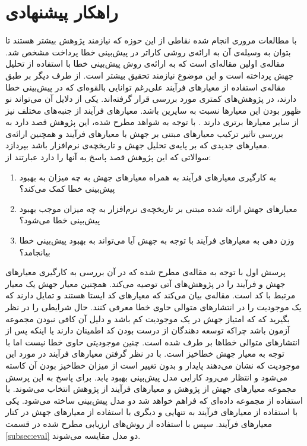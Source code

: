 \section{راهکار پیشنهادی}
\label{sec:method}
با  مطالعات مروری انجام شده نقاطی از این حوزه که نیازمند پژوهش بیشتر هستند تا بتوان به وسیله‌ی آن به ارائه‌ی روشی کاراتر در پیش‌بینی خطا پرداخت مشخص شد. مقاله‌ی \cite{bowes2016mutation} اولین مقاله‌ای است که  به ارائه‌ی روش پیش‌بینی خطا با استفاده از تحلیل جهش پرداخته است و این موضوع نیازمند تحقیق بیشتر است. از طرف دیگر بر طبق مقاله‌ی \cite{radjenovic2013software} استفاده از معیارهای فرآیند علی‌رغم توانایی بالقوه‌ای که در پیش‌بینی خطا دارند، در پژوهش‌های کمتری مورد بررسی قرار گرفته‌اند. یکی از دلایل آن می‌تواند نو ظهور بودن این معیارها نسبت به سایرین باشد. معیارهای فرآیند از جنبه‌های مختلف نیز از سایر معیار‌ها برتری دارند \cite{rahman2013and}. با توجه به شواهد مطرح شده، این پژوهش قصد دارد به بررسی تاثیر ترکیب معیارهای مبتنی بر جهش با معیارهای فرآیند و همچنین ارائه‌ی معیارهای جدیدی که بر پایه‌ی تحلیل جهش و تاریخچه‌ی نرم‌افزار باشد بپردازد.\\
سوالاتی که این پژوهش قصد پاسخ به آنها را دارد عبارتند از:

\begin{enumerate}
	\item  
	به کارگیری معیارهای فرآیند به همراه معیارهای جهش به چه میزان به بهبود پیش‌بینی خطا کمک می‌کند؟
	\item 
	معیارهای جهش ارائه شده مبتنی بر تاریخچه‌ی نرم‌افزار به چه میزان موجب بهبود پیش‌بینی خطا می‌شود؟
	\item 
	وزن دهی به معیارهای فرآیند با توجه به جهش آیا می‌تواند به بهبود پیش‌بینی خطا بیانجامد؟  
\end{enumerate}

پرسش اول با توجه به مقاله‌ی \cite{bowes2016mutation} مطرح شده که در آن بررسی به کارگیری معیارهای جهش و فرآیند را در پژوهش‌های آتی توصیه می‌کند.  همچنین  معیار جهش یک معیار  مرتبط با کد است. مقاله‌ی \cite{rahman2013and}  بیان می‌کند که معیارهای کد ایستا هستند و تمایل دارند که یک موجودیت را در انتشارهای متوالی حاوی خطا معرفی کنند. حال شرایطی را در نظر بگیرید که که امتیاز جهش در یک موجودیت کم باشد و دلیل آن کافی نبودن مجموعه آزمون باشد چراکه توسعه دهندگان از درست بودن کد اطمینان دارند یا اینکه پس از انتشارهای متوالی خطاها بر طرف شده است. چنین موجودیتی حاوی خطا نیست اما با توجه به معیار جهش خطا‌خیز است. با در نظر گرفتن معیارهای فرآیند در مورد این موجودیت که نشان می‌دهند پایدار و بدون تغییر است از میزان خطا‌خیز بودن آن کاسته می‌شود و انتظار می‌رود کارایی مدل پیش‌بینی بهبود یابد. 
برای پاسخ به این پرسش مجموعه معیارهای جهش  از پژوهش \cite{bowes2016mutation}  و معیارهای فرآیند از پژوهش \cite{rahman2013and} انتخاب می‌شوند. با استفاده از مجموعه داده‌ای  که فراهم خواهد شد دو مدل پیش‌بینی ساخته می‌شود. یکی با استفاده از معیارهای فرآیند به تنهایی و دیگری با استفاده از معیارهای جهش در کنار معیارهای فرآیند. سپس  با استفاده از روش‌های ارزیابی مطرح شده در قسمت \ref{subsec:eval}  دو مدل مقایسه می‌شوند. \\

